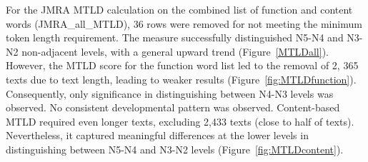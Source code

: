 
For the JMRA MTLD calculation on the combined list of function and content words (JMRA\_all\_MTLD), 36 rows were removed
for not
meeting the minimum token length requirement. The measure successfully distinguished N5-N4 and N3-N2 non-adjacent
levels, with a
general upward trend (Figure~\ref{MTLDall}). However, the MTLD score for the function word list led to the removal of 2,
365
texts due to
text length, leading to weaker results (Figure~\ref{fig:MTLDfunction}). Consequently, only significance in
distinguishing
between N4-N3
levels was observed. No consistent developmental pattern was observed. Content-based MTLD required even longer
texts, excluding 2,433 texts (close to half of texts). Nevertheless, it captured meaningful differences at the lower 
levels in distinguishing between N5-N4 and N3-N2 levels (Figure~\ref{fig:MTLDcontent}). 


